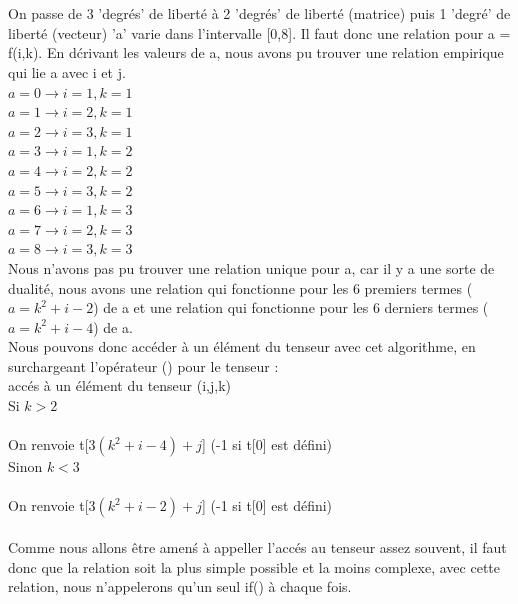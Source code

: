 \documentclass[a4paper,11pt,fleqn]{report}
\begin{document}
	\\\\On passe de 3 'degr\'es' de libert\'e \`a 2 'degr\'es' de libert\'e (matrice) puis 1 'degr\'e' de libert\'e (vecteur)
	'a' varie dans l'intervalle [0,8]. Il faut donc une relation pour a = f(i,k). En d\'crivant les valeurs de a, nous avons pu trouver une relation empirique qui lie a avec i et j.\\
	$a = 0 \to  i=1, k=1$\\
	$a = 1 \to  i=2, k=1$\\
	$a = 2 \to  i=3, k=1$\\
	$a = 3 \to  i=1, k=2$\\
	$a = 4 \to  i=2, k=2$\\
	$a = 5 \to  i=3, k=2$\\
	$a = 6 \to  i=1, k=3$\\
	$a = 7 \to  i=2, k=3$\\
	$a = 8 \to  i=3, k=3$\\
	Nous n'avons pas pu trouver une relation unique pour a, car il y a une sorte de dualit\'e, nous avons une relation qui fonctionne pour les 6 premiers termes ($ a = k^2 + i - 2$) de a et une relation qui fonctionne pour les 6 derniers termes ($ a = k^2 + i - 4 $) de a.
	\\
	Nous pouvons donc acc\'eder \`a un \'el\'ement du tenseur avec cet algorithme, en surchargeant l'op\'erateur () pour le tenseur :
	\\acc\'es \`a un \'el\'ement du tenseur (i,j,k)
	\\Si $k > 2$\\\\On renvoie t[$3(k^2 + i - 4) + j $]   (-1 si t[0] est d\'efini)
	\\Sinon $k < 3$\\\\On renvoie t[$3(k^2 + i - 2) + j $]   (-1 si t[0] est d\'efini)
	\\\\Comme nous allons \^etre amen\'s \`a appeller l'acc\'es au tenseur assez souvent, il faut donc que la relation soit la plus simple possible et la moins complexe, avec cette relation, nous n'appelerons qu'un seul if() \`a chaque fois.
	\\
	\\
	\\
\end{document}
